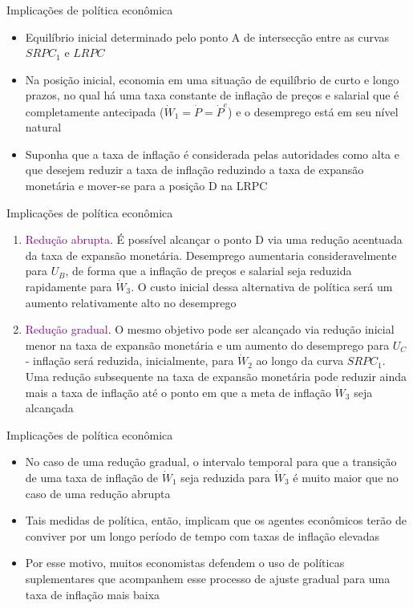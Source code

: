 \documentclass[10pt]{beamer}
\begin{document}
\begin{frame}{Implicações de política econômica}
    \begin{itemize}
        \item Equilíbrio inicial determinado pelo ponto A de intersecção entre as curvas $SRPC_1$ e $LRPC$
        \bigskip
        \item Na posição inicial, economia em uma situação de equilíbrio de curto e longo prazos, no qual há uma taxa constante de inflação de preços e salarial que é completamente antecipada ($\dot{W}_1 = \dot{P} = \dot{P}^e$) e o desemprego está em seu nível natural
        \bigskip
        \item Suponha que a taxa de inflação é considerada pelas autoridades como alta e que desejem reduzir a taxa de inflação reduzindo a taxa de expansão monetária e mover-se para a posição D na LRPC
    \end{itemize}    
\end{frame}

\begin{frame}{Implicações de política econômica}
    \begin{enumerate}
        \item \textcolor{purple}{Redução abrupta}. É possível alcançar o ponto D via uma redução acentuada da taxa de expansão monetária. Desemprego aumentaria consideravelmente para $U_B$, de forma que a inflação de preços e salarial seja reduzida rapidamente para $\dot{W}_3$. O custo inicial dessa alternativa de política será um aumento relativamente alto no desemprego
        \bigskip
        \item \textcolor{purple}{Redução gradual}. O mesmo objetivo pode ser alcançado via redução inicial menor na taxa de expansão monetária e um aumento do desemprego para $U_C$ - inflação será reduzida, inicialmente, para $\dot{W}_2$ ao longo da curva $SRPC_1$. Uma redução subsequente na taxa de expansão monetária pode reduzir ainda mais a taxa de inflação até o ponto em que a meta de inflação $\dot{W}_3$ seja alcançada
    \end{enumerate}    
\end{frame}

\begin{frame}{Implicações de política econômica}
    \begin{itemize}
        \item No caso de uma redução gradual, o intervalo temporal para que a transição de uma taxa de inflação de $\dot{W}_1$ seja reduzida para $\dot{W}_3$ é muito maior que no caso de uma redução abrupta
        \bigskip
        \item Tais medidas de política, então, implicam que os agentes econômicos terão de conviver por um longo período de tempo com taxas de inflação elevadas
        \bigskip
        \item Por esse motivo, muitos economistas defendem o uso de políticas suplementares que acompanhem esse processo de ajuste gradual para uma taxa de inflação mais baixa
    \end{itemize}    
\end{frame}
\end{document}

